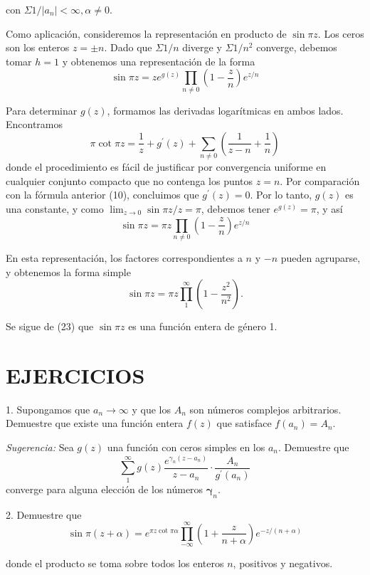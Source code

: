 \documentclass{article}
\theoremstyle{nonumberplain}
\begin{document}
\begin{theorem}[7]
con \( \Sigma 1 /\left|a_{n}\right|<\infty, \alpha \neq 0 \).

Como aplicación, consideremos la representación en producto de \( \sin \pi z \). Los ceros son los enteros \( z= \pm n \). Dado que \( \Sigma 1 / n \) diverge y \( \Sigma 1 / n^{2} \) converge, debemos tomar \( h=1 \) y obtenemos una representación de la forma
\[
\sin \pi z=z e^{g(z)} \prod_{n \neq 0}\left(1-\frac{z}{n}\right) e^{z / n}
\]

Para determinar \( g(z) \), formamos las derivadas logarítmicas en ambos lados. Encontramos
\[
\pi \cot \pi z=\frac{1}{z}+g^{\prime}(z)+\sum_{n \neq 0}\left(\frac{1}{z-n}+\frac{1}{n}\right)
\]
donde el procedimiento es fácil de justificar por convergencia uniforme en cualquier conjunto compacto que no contenga los puntos \( z=n \). Por comparación con la fórmula anterior (10), concluimos que \( g^{\prime}(z)=0 \). Por lo tanto, \( g(z) \) es una constante, y como \( \lim _{z \rightarrow 0} \sin \pi z / z=\pi \), debemos tener \( e^{g(z)}=\pi \), y así
\[
\sin \pi z=\pi z \prod_{n \neq 0}\left(1-\frac{z}{n}\right) e^{z / n}
\]

En esta representación, los factores correspondientes a \( n \) y \( -n \) pueden agruparse, y obtenemos la forma simple
\[
\sin \pi z=\pi z \prod_{1}^{\infty}\left(1-\frac{z^{2}}{n^{2}}\right) .
\]

Se sigue de (23) que \( \sin \pi z \) es una función entera de género 1.

\section*{EJERCICIOS}
1. Supongamos que \( a_{n} \rightarrow \infty \) y que los \( A_{n} \) son números complejos arbitrarios. Demuestre que existe una función entera \( f(z) \) que satisface \( f\left(a_{n}\right)=A_{n} \).

\emph{Sugerencia:} Sea \( g(z) \) una función con ceros simples en los \( a_{n} \). Demuestre que
\[
\sum_{1}^{\infty} g(z) \frac{e^{\gamma_{n}\left(z-a_{n}\right)}}{z-a_{n}} \cdot \frac{A_{n}}{g^{\prime}\left(a_{n}\right)}
\]
converge para alguna elección de los números \( \boldsymbol{\gamma}_{n} \).

2. Demuestre que
\[
\sin \pi(z+\alpha)=e^{\pi z \cot \pi \alpha} \prod_{-\infty}^{\infty}\left(1+\frac{z}{n+\alpha}\right) e^{-z /(n+\alpha)}
\]

\noindent donde el producto se toma sobre todos los enteros \( n \), positivos y negativos.


\end{theorem}
\end{document}
